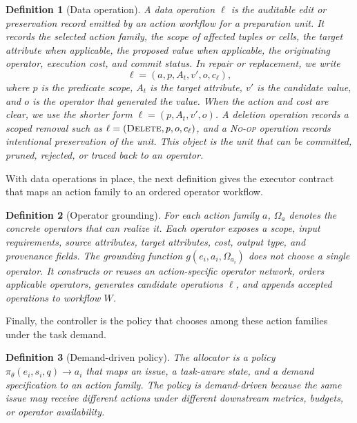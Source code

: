 \documentclass[sigconf, nonacm]{acmart}
\newcommand{\noop}{\textsc{No-op}\xspace}
\newcommand{\deleteop}{\textsc{Delete}\xspace}
\newtheorem{definition}{Definition}
\begin{document}
\begin{definition}[Data operation]
A data operation $\ell$ is the auditable edit or preservation record emitted by an action workflow for a preparation unit. It records the selected action family, the scope of affected tuples or cells, the target attribute when applicable, the proposed value when applicable, the originating operator, execution cost, and commit status. In repair or replacement, we write
\[
  \ell=(a,p,A_t,v',o,c_\ell),
\]
where $p$ is the predicate scope, $A_t$ is the target attribute, $v'$ is the candidate value, and $o$ is the operator that generated the value. When the action and cost are clear, we use the shorter form $\ell=(p,A_t,v',o)$. A deletion operation records a scoped removal such as $\ell=(\deleteop,p,o,c_\ell)$, and a \noop operation records intentional preservation of the unit. This object is the unit that can be committed, pruned, rejected, or traced back to an operator.
\end{definition}

With data operations in place, the next definition gives the executor contract that maps an action family to an ordered operator workflow.

\begin{definition}[Operator grounding]
For each action family $a$, $\Omega_a$ denotes the concrete operators that can realize it. Each operator exposes a scope, input requirements, source attributes, target attributes, cost, output type, and provenance fields. The grounding function $g(e_i,a_i,\Omega_{a_i})$ does not choose a single operator. It constructs or reuses an action-specific operator network, orders applicable operators, generates candidate operations $\ell$, and appends accepted operations to workflow $W$.
\end{definition}

Finally, the controller is the policy that chooses among these action families under the task demand.

\begin{definition}[Demand-driven policy]
The allocator is a policy $\pi_\theta(e_i,s_i,q)\rightarrow a_i$ that maps an issue, a task-aware state, and a demand specification to an action family. The policy is demand-driven because the same issue may receive different actions under different downstream metrics, budgets, or operator availability.
\end{definition}
\end{document}
